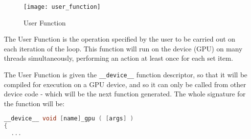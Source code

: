 \begin{wrapfigure}[13]{r}{.33\textwidth}
  \centering
  \caption{User Function}
  \label{fig:usr_func}
  \texttt{[image: user\_function]}
\end{wrapfigure}
The User Function is the operation specified by the user to be carried out on each iteration of the loop. This function will run on the device (GPU) on many threads simultaneously, performing an action at least once for each set item.
\par
The User Function is given the \verb|__device__| function  descriptor, so that it will be compiled for execution on a GPU device, and so it can only be called from other device code - which will be the next function generated. The whole signature for the function will be:
\begin{lstlisting}[language=C, backgroundcolor=\color{red!20}]
__device__ void [name]_gpu ( [args] )
{
  ...
\end{lstlisting}

